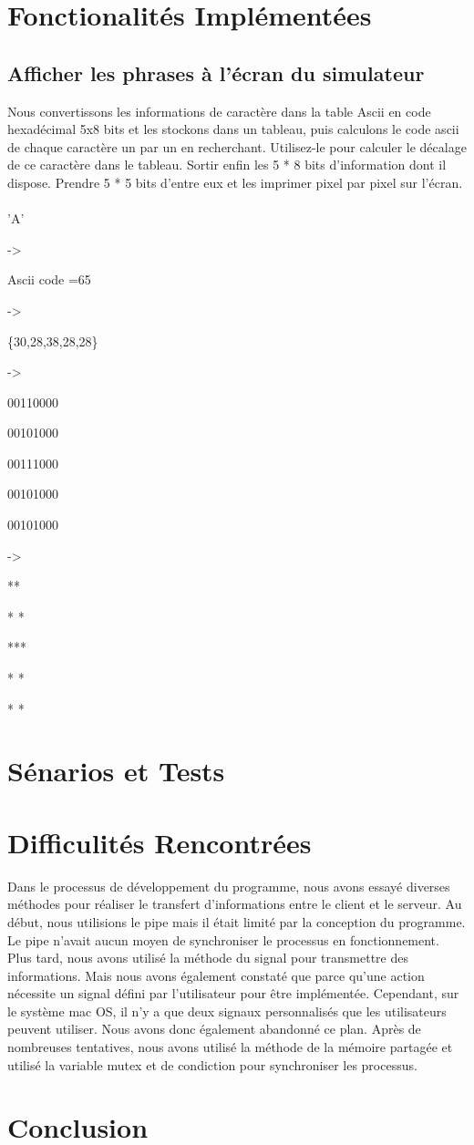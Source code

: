 \documentclass[14px]{article}
\begin{document}
\section{Fonctionalités Implémentées}
\subsection{Afficher les phrases à l'écran du simulateur}
Nous convertissons les informations de caractère dans la table Ascii en code hexadécimal 5x8 bits et les stockons dans un tableau, puis calculons le code ascii de chaque caractère un par un en recherchant. Utilisez-le pour calculer le décalage de ce caractère dans le tableau. Sortir enfin les 5 * 8 bits d'information dont il dispose. Prendre 5 * 5 bits d'entre eux et les imprimer pixel par pixel sur l'écran.
~\\

'A'

->

Ascii code =65

 ->

\{30,28,38,28,28\}

->

00110000

00101000

00111000

00101000

00101000

->

  **

  * *

  ***

  * *

  * *

\section{Sénarios et Tests}

\section{Difficulités Rencontrées}

Dans le processus de développement du programme, nous avons essayé diverses méthodes pour réaliser le transfert d'informations entre le client et le serveur. Au début, nous utilisions le pipe mais il était limité par la conception du programme. Le pipe n'avait aucun moyen de synchroniser le processus en fonctionnement. Plus tard, nous avons utilisé la méthode du signal pour transmettre des informations. Mais nous avons également constaté que parce qu'une action nécessite un signal défini par l'utilisateur pour être implémentée. Cependant, sur le système mac OS, il n'y a que deux signaux personnalisés que les utilisateurs peuvent utiliser. Nous avons donc également abandonné ce plan. Après de nombreuses tentatives, nous avons utilisé la méthode de la mémoire partagée et utilisé la variable mutex et de condiction pour synchroniser les processus.

\section{Conclusion}
\end{document}
